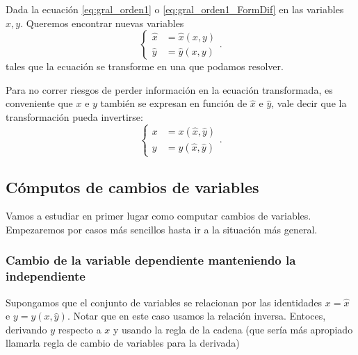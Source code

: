 \begin{problema}
 Dada la ecuación \eqref{eq:gral_orden1} o \eqref{eq:gral_orden1_FormDif} en las variables $x,y$. Queremos encontrar nuevas variables 
 \begin{equation}\label{eq:cambio_prin}
  \left \{\begin{array}{cc}
	    \hat{x}&=\hat{x}(x,y)\\
	    \hat{y}&=\hat{y}(x,y)
          \end{array}
 \right. .
 \end{equation}
tales que la ecuación se transforme en una que podamos resolver.
\end{problema}

Para no correr riesgos de perder información en la ecuación transformada, es conveniente que 
$x$ e $y$ también se expresan en función de $\hat{x}$ e $\hat{y}$, vale decir que la transformación pueda invertirse:
 \begin{equation}\label{eq:cambio_inv}
  \left \{\begin{array}{cc}
	    x&=x(\hat{x},\hat{y})\\
	    y&=y(\hat{x},\hat{y})
          \end{array}
 \right. .
 \end{equation}
\subsection{Cómputos de cambios de variables}
Vamos a estudiar en primer lugar como computar cambios de variables. Empezaremos por casos más sencillos hasta ir a la situación más general.

\subsubsection{Cambio de la variable dependiente manteniendo la independiente}

 Supongamos que el conjunto de variables se relacionan  por las identidades $x=\hat{x}$ e  $y=y(x,\hat{y})$. Notar que en este caso usamos la relación inversa. Entoces, derivando $y$ respecto a $x$ y usando la regla de la cadena (que sería más apropiado llamarla regla de cambio de variables para la derivada)


